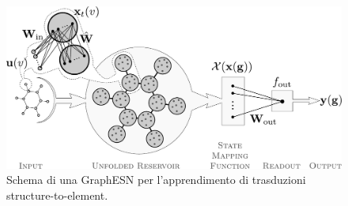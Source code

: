 \begin{figure}[tbp]
\centering
\includegraphics[width=0.95\columnwidth]{img/GraphESN-v2}
\medskip
\caption[GraphESN.]{Schema di una GraphESN per l'apprendimento di trasduzioni structure-to-element.}
\label{fig:intro:gesn}
\end{figure}

